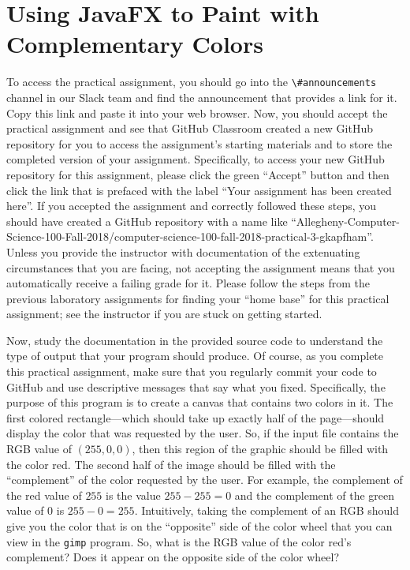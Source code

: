 \documentclass[11pt]{article}
\newcommand{\channel}[1]{\lstinline{#1}}
\begin{document}
\section*{Using JavaFX to Paint with Complementary Colors}

To access the practical assignment, you should go into the
\channel{\#announcements} channel in our Slack team and find the announcement
that provides a link for it. Copy this link and paste it into your web browser.
Now, you should accept the practical assignment and see that GitHub Classroom
created a new GitHub repository for you to access the assignment's starting
materials and to store the completed version of your assignment. Specifically,
to access your new GitHub repository for this assignment, please click the green
``Accept'' button and then click the link that is prefaced with the label ``Your
assignment has been created here''. If you accepted the assignment and correctly
followed these steps, you should have created a GitHub repository with a name
like
``Allegheny-Computer-Science-100-Fall-2018/computer-science-100-fall-2018-practical-3-gkapfham''.
Unless you provide the instructor with documentation of the extenuating
circumstances that you are facing, not accepting the assignment means that you
automatically receive a failing grade for it. Please follow the steps from the
previous laboratory assignments for finding your ``home base'' for this
practical assignment; see the instructor if you are stuck on getting started.

Now, study the documentation in the provided source code to understand the type
of output that your program should produce. Of course, as you complete this
practical assignment, make sure that you regularly commit your code to GitHub
and use descriptive messages that say what you fixed. Specifically, the purpose
of this program is to create a canvas that contains two colors in it. The first
colored rectangle---which should take up exactly half of the page---should
display the color that was requested by the user. So, if the input file contains
the RGB value of $(255,0,0)$, then this region of the graphic should be filled
with the color red. The second half of the image should be filled with the
``complement'' of the color requested by the user. For example, the complement
of the red value of $255$ is the value $255-255=0$ and the complement of the
green value of $0$ is $255-0=255$. Intuitively, taking the complement of an RGB
should give you the color that is on the ``opposite'' side of the color wheel
that you can view in the {\tt gimp} program. So, what is the RGB value of the
color red's complement? Does it appear on the opposite side of the color wheel?
\end{document}

